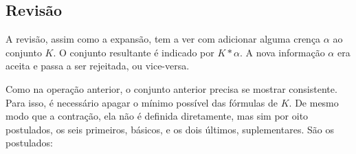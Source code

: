 \subsection{Revisão}

A revisão, assim como a expansão, tem a ver com adicionar alguma crença $ \alpha $ ao conjunto $ K $. O conjunto resultante é indicado por $ K \ast \alpha $. A nova informação $ \alpha $ era aceita e passa a ser rejeitada, ou vice-versa.

Como na operação anterior, o conjunto anterior precisa se mostrar consistente. Para isso, é necessário apagar o mínimo possível das fórmulas de $ K $. De mesmo modo que a contração, ela não é definida diretamente, mas sim por oito postulados, os seis primeiros, básicos, e os dois últimos, suplementares. São os postulados:

